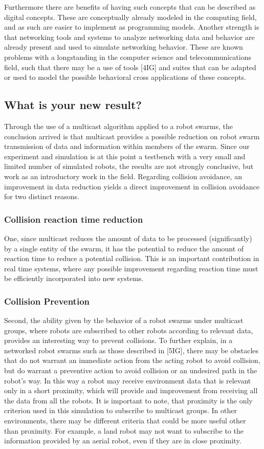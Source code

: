 \documentclass[journal]{IEEEtran}
\begin{document}
\begin{itemize}
Furthermore there are benefits of having such concepts that can be described as digital concepts. These are conceptually already modeled in the computing field, and as such are easier to implement as programming models. 
Another strength is that networking tools and systems to analyze networking data and behavior are already present and used to simulate networking behavior. These are known problems with a longstanding in the computer science and telecommunications field, such that there may be a use of tools [4IG] and suites that can be adapted or used to model the possible behavioral cross applications of these concepts.


\subsection{What is your new result?}
Through the use of a multicast algorithm applied to a robot swarms, the conclusion arrived is that multicast provides a possible reduction on robot swarm transmission of data and information within members of the swarm. Since our experiment and simulation is at this point a testbench with a very small and limited number of simulated robots, the results are not strongly conclusive, but work as an introductory work in the field.  
Regarding collision avoidance, an improvement in data reduction yields a direct improvement in collision avoidance for two distinct reasons. 
\subsubsection{Collision reaction time reduction}
One, since multicast reduces the amount of data to be processed (significantly) by a single entity of the swarm, it has the potential to reduce the amount of reaction time to reduce a potential collision. This is an important contribution in real time systems, where any possible improvement regarding reaction time must be efficiently incorporated into new systems.
\subsubsection{Collision Prevention}
Second, the ability given by the behavior of a robot swarms under multicast groups, where robots are subscribed to other robots according to relevant data, provides an interesting way to prevent collisions. To further explain, in a networked robot swarms such as those described in [5IG], there may be obstacles that do not warrant an immediate action from the acting robot to avoid collision, but do warrant a preventive action to avoid collision or an undesired path in the robot’s way. In this way a robot may receive environment data that is relevant only in a short proximity, which will provide and improvement from receiving all the data from all the robots. It is important to note, that proximity is the only criterion used in this simulation to subscribe to multicast groups. In other environments, there may be different criteria that could be more useful other than proximity. For example, a land robot may not want to subscribe to the information provided by an aerial robot, even if they are in close proximity.



\end{itemize}
\end{document}

